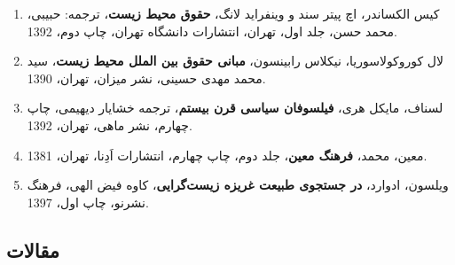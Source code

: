 \begin{enumerate}
\item 	کیس الکساندر، اچ پیتر سند و وینفراید لانگ، \textbf{حقوق محیط زیست}، ترجمه: حبیبی، محمد حسن، جلد اول، تهران، انتشارات دانشگاه تهران، چاپ دوم، 1392.

\item 	لال کوروکولاسوریا، نیکلاس رابینسون، \textbf{مبانی حقوق بین الملل محیط زیست}، سید محمد مهدی حسینی، نشر میزان، تهران، 1390.

\item 	لسناف، مایکل هری، \textbf{فیلسوفان سیاسی قرن بیستم}، ترجمه خشایار دیهیمی، چاپ چهارم، نشر ماهی، تهران، 1392.

\item 	معین، محمد، \textbf{فرهنگ معین}، جلد دوم، چاپ چهارم، انتشارات اَدِنا، تهران، 1381.

\item 	ویلسون، ادوارد، \textbf{در جستجوی طبیعت غریزه زیست‌گرایی}، کاوه فیض الهی، فرهنگ‌ نشر‌نو، چاپ اول، 1397.
	
	
	
	
				\end{enumerate}

		\subsection*{مقالات}


